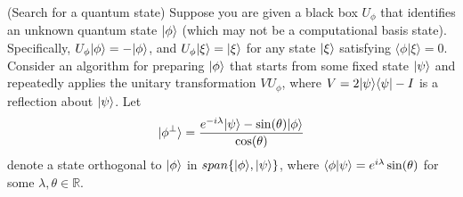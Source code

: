 \newpage 
\begin{questions}
  
\question (Search for a quantum state) Suppose you are given a black
  box $U_\phi$ that identifies an unknown quantum state $\lvert \phi \rangle$
  (which may not be a computational basis state). Specifically,
  $U_\phi\lvert \phi \rangle= - \lvert \phi \rangle$, and
  $U_\phi{\lvert \xi \rangle} = \lvert \xi \rangle$ for any state $\lvert \xi \rangle$ satisfying
  $\langle \phi | \xi \rangle = 0$. Consider an algorithm for
  preparing $\lvert \phi \rangle$ that starts from some fixed state
  $\lvert \psi \rangle$ and repeatedly applies the unitary transformation
  $VU_\phi$, where $V = 2\lvert \psi \rangle\langle \psi \rvert - I$ is a reflection about
  $\lvert \psi \rangle$.  Let
  \[ \lvert \phi^\perp \rangle = \frac{e^{-i \lambda}\lvert \psi \rangle -
      \sin(\theta)\lvert \phi \rangle}{\cos(\theta)} \] denote a state
  orthogonal to $\lvert \phi \rangle$ in $span\{\lvert \phi \rangle, \lvert \psi \rangle\}$,
  where $\langle \phi \rvert \psi \rangle =e^{i\lambda } \sin(\theta) $ for some
  $\lambda,\theta \in \mathbb{R}$.
\end{questions}
